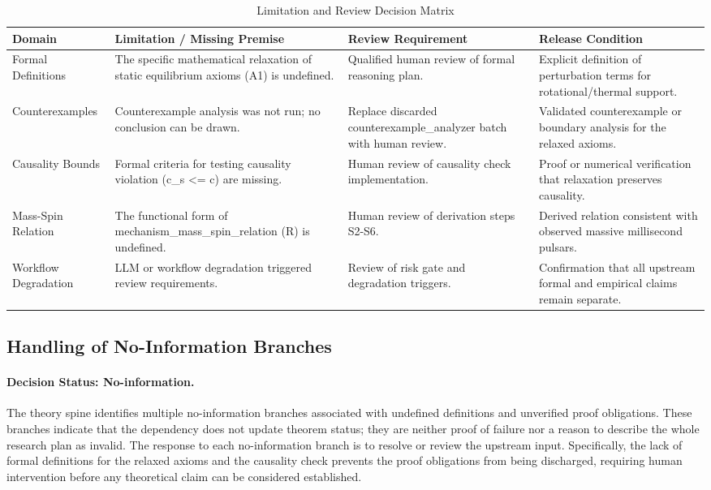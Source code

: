 \documentclass[conference]{IEEEtran}
\begin{document}
\begin{table}[htbp]
\centering
\footnotesize
\setlength{\tabcolsep}{3pt}
\renewcommand{\arraystretch}{1.12}
\caption{Limitation and Review Decision Matrix}
\label{tab:risk-limitations-and-review-risk-matrix}
\begin{tabular}{|p{}|p{}|p{}|p{}|}
\hline
Domain & Limitation / Missing Premise & Review Requirement & Release Condition \\\hline
Formal Definitions & The specific mathematical relaxation of static equilibrium axioms (A1) is undefined. & Qualified human review of formal reasoning plan. & Explicit definition of perturbation terms for rotational/thermal support. \\\hline
Counterexamples & Counterexample analysis was not run; no conclusion can be drawn. & Replace discarded counterexample\_analyzer batch with human review. & Validated counterexample or boundary analysis for the relaxed axioms. \\\hline
Causality Bounds & Formal criteria for testing causality violation (c\_s <= c) are missing. & Human review of causality check implementation. & Proof or numerical verification that relaxation preserves causality. \\\hline
Mass-Spin Relation & The functional form of mechanism\_mass\_spin\_relation (R) is undefined. & Human review of derivation steps S2-S6. & Derived relation consistent with observed massive millisecond pulsars. \\\hline
Workflow Degradation & LLM or workflow degradation triggered review requirements. & Review of risk gate and degradation triggers. & Confirmation that all upstream formal and empirical claims remain separate. \\\hline
\end{tabular}
\end{table}

\subsection{Handling of No-Information Branches}
\paragraph{Decision Status: No-information.} The theory spine identifies multiple no-information branches associated with undefined definitions and unverified proof obligations. These branches indicate that the dependency does not update theorem status; they are neither proof of failure nor a reason to describe the whole research plan as invalid. The response to each no-information branch is to resolve or review the upstream input. Specifically, the lack of formal definitions for the relaxed axioms and the causality check prevents the proof obligations from being discharged, requiring human intervention before any theoretical claim can be considered established.
\end{document}
